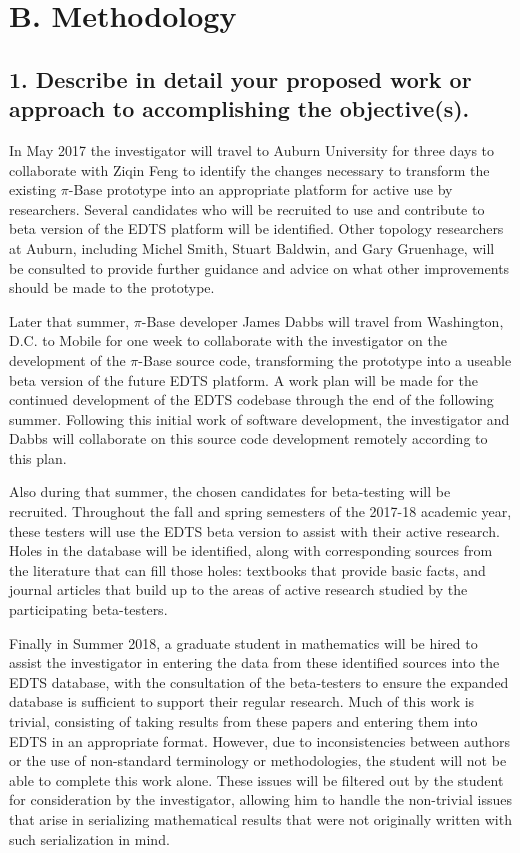\documentclass[10pt]{article}
\begin{document}
\section*{B. Methodology}

\subsection*{1.	Describe in detail your proposed work or approach to accomplishing the objective(s).}


In May 2017 the investigator will travel to Auburn University
  for three days to
  collaborate with Ziqin Feng to identify the changes necessary
  to transform the existing
  \(\pi\)-Base prototype into an appropriate platform for
  active use by researchers. Several
  candidates who will be recruited to use and contribute to
  beta version of the EDTS platform will be identified. Other topology
  researchers at Auburn, including
  Michel Smith, Stuart Baldwin, and Gary Gruenhage, will be consulted to
  provide further guidance and advice on what other improvements should be
  made to the prototype.

Later that summer, \(\pi\)-Base developer James Dabbs will travel from
  Washington, D.C. to Mobile for one week
  to collaborate with the investigator on
  the development of the \(\pi\)-Base source code, transforming the
  prototype into a useable beta version of the future EDTS platform.
  A work plan will be made
  for the continued development of the EDTS codebase through
  the end of the following summer. Following this initial work of
  software development, the investigator and Dabbs will
  collaborate on this source code development remotely according to
  this plan.

Also during that summer, the chosen candidates for beta-testing
  will be recruited.
  Throughout the fall and spring semesters of the 2017-18 academic year,
  these testers will use
  the EDTS beta version to assist with their active research.
  Holes in the database will be identified, along with corresponding
  sources from the literature that can fill those holes: textbooks that
  provide basic facts, and journal articles that build up to the areas
  of active research studied by the participating beta-testers.

Finally in Summer 2018, a graduate student in mathematics will be hired to
  assist the investigator in entering the data from these identified sources
  into the EDTS database, with the consultation of the beta-testers to
  ensure the expanded database is sufficient to support
  their regular research. Much of this work is trivial, consisting of
  taking results from these papers and entering them into EDTS in an appropriate
  format. However, due to inconsistencies between authors or the use of
  non-standard terminology or methodologies, the student will not be able to
  complete this work alone. These issues will be filtered out by the student
  for consideration by the investigator, allowing him to handle the
  non-trivial issues that arise in serializing mathematical results that
  were not originally written with such serialization in mind.
\end{document}
